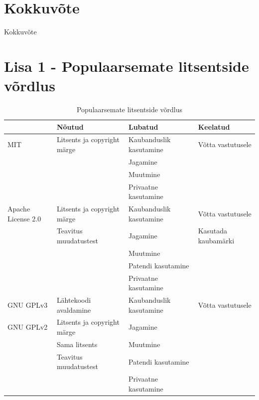 \documentclass[a4paper,12pt]{article} %
\begin{document}
\section{Kokkuvõte}
Kokkuvõte

\pagebreak




\pagebreak


\section*{Lisa 1 - Populaarsemate litsentside võrdlus}
\label{lisa1}
\begin{table}[H]
\centering
\caption{Populaarsemate litsentside võrdlus}
\label{table_litsentside_vordlus}
\begin{tabular}{|p{3cm}|p{4cm}|p{4cm}|p{4cm}|}
\hline
\rowcolor{rowgray}
 & Nõutud & Lubatud & Keelatud \\ \hline
MIT & Litsents ja copyright märge & Kaubanduslik kasutamine & Võtta vastutusele \\
 &  & Jagamine &  \\
 &  & Muutmine &  \\
 &  & Privaatne kasutamine &  \\ \hline
Apache \newline License 2.0 & Litsents ja copyright märge & Kaubanduslik kasutamine & Võtta vastutusele \\
 & Teavitus muudatustest & Jagamine & Kasutada kaubamärki \\
 &  & Muutmine &  \\
 &  & Patendi kasutamine &  \\
 &  & Privaatne kasutamine &  \\ \hline
GNU GPLv3 & Lähtekoodi avaldamine & Kaubanduslik kasutamine & Võtta vastutusele \\
GNU GPLv2 & Litsents ja copyright märge & Jagamine &  \\
 & Sama litsents & Muutmine &  \\
 & Teavitus muudatustest & Patendi kasutamine &  \\
 &  & Privaatne kasutamine & \\ \hline
\end{tabular}
\cite{Licences}
\end{table}
\pagebreak
\end{document}
